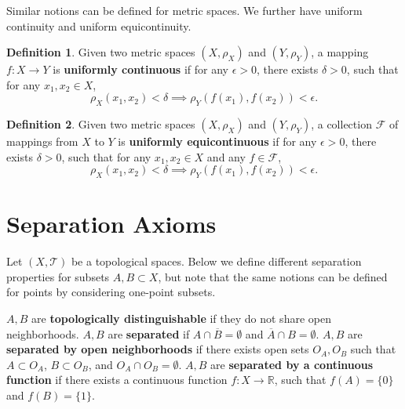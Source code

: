 \documentclass[openany]{book}
\theoremstyle{definition}
\newtheorem{definition}{Definition}[chapter]
\theoremstyle{remark}
\begin{document}
Similar notions can be defined for metric spaces. We further have uniform continuity and uniform equicontinuity.
\begin{definition}
    Given two metric spaces $(X,\rho_X)$ and $(Y,\rho_Y)$, a mapping $f:X\to Y$ is \textbf{uniformly continuous} if for any $\epsilon>0$, there exists $\delta>0$, such that for any $x_1,x_2\in X$,
    \begin{equation*}
        \rho_X(x_1,x_2)<\delta\implies\rho_Y(f(x_1),f(x_2))<\epsilon.
    \end{equation*}
\end{definition}
\begin{definition}
    Given two metric spaces $(X,\rho_X)$ and $(Y,\rho_Y)$, a collection $\mathcal{F}$ of mappings from $X$ to $Y$ is \textbf{uniformly equicontinuous} if for any $\epsilon>0$, there exists $\delta>0$, such that for any $x_1,x_2\in X$ and any $f\in \mathcal{F}$,
    \begin{equation*}
        \rho_X(x_1,x_2)<\delta\implies\rho_Y(f(x_1),f(x_2))<\epsilon.
    \end{equation*}
\end{definition}

\section{Separation Axioms}
Let $(X,\mathcal{T})$ be a topological spaces. Below we define different separation properties for subsets $A,B\subset X$, but note that the same notions can be defined for points by considering one-point subsets.

$A,B$ are \textbf{topologically distinguishable} if they do not share open neighborhoods. $A,B$ are \textbf{separated} if $A\cap\overline{B}=\emptyset$ and $\overline{A}\cap B=\emptyset$. $A,B$ are \textbf{separated by open neighborhoods} if there exists open sets $O_A,O_B$ such that $A\subset O_A$, $B\subset O_B$, and $O_A\cap O_B=\emptyset$. $A,B$ are \textbf{separated by a continuous function} if there exists a continuous function $f:X\to \mathbb{R}$, such that $f(A)=\{0\}$ and $f(B)=\{1\}$.
\end{document}
